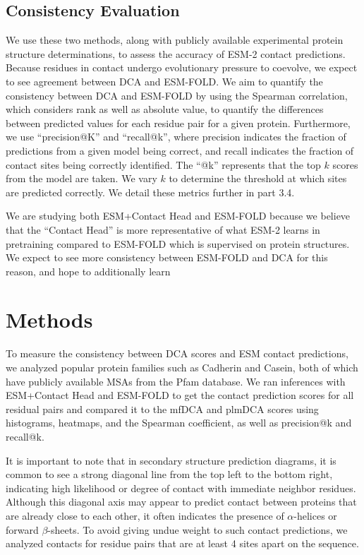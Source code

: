\documentclass{article}
\begin{document}
\subsection{Consistency Evaluation}

We use these two methods, along with publicly available experimental protein structure determinations, to assess the accuracy of ESM-2 contact predictions. Because residues in contact undergo evolutionary pressure to coevolve, we expect to see agreement between DCA and ESM-FOLD. We aim to quantify the consistency between DCA and ESM-FOLD by using the Spearman correlation, which considers rank as well as absolute value, to quantify the differences between predicted values for each residue pair for a given protein. Furthermore, we use ``precision@K'' and ``recall@k'', where precision indicates the fraction of predictions from a given model being correct, and recall indicates the fraction of contact sites being correctly identified. The ``@k'' represents that the top $k$ scores from the model are taken. We vary $k$ to determine the threshold at which sites are predicted correctly. We detail these metrics further in part 3.4. 

We are studying both ESM+Contact Head and ESM-FOLD because we believe that the ``Contact Head'' is more representative of what ESM-2 learns in pretraining compared to ESM-FOLD which is supervised on protein structures. We expect to see more consistency between ESM-FOLD and DCA for this reason, and hope to additionally learn

\section{Methods}

To measure the consistency between DCA scores and ESM contact predictions, we analyzed popular protein families such as Cadherin and Casein, both of which have publicly available MSAs from the Pfam database. We ran inferences with ESM+Contact Head and ESM-FOLD to get the contact prediction scores for all residual pairs and compared it to the mfDCA and plmDCA scores using histograms, heatmaps, and the Spearman coefficient, as well as precision@k and recall@k. 

It is important to note that in secondary structure prediction diagrams, it is common to see a strong diagonal line from the top left to the bottom right, indicating high likelihood or degree of contact with immediate neighbor residues. Although this diagonal axis may appear to predict contact between proteins that are already close to each other, it often indicates the presence of $\alpha$-helices or forward $\beta$-sheets. To avoid giving undue weight to such contact predictions, we analyzed contacts for residue pairs that are at least 4 sites apart on the sequence.
\end{document}
